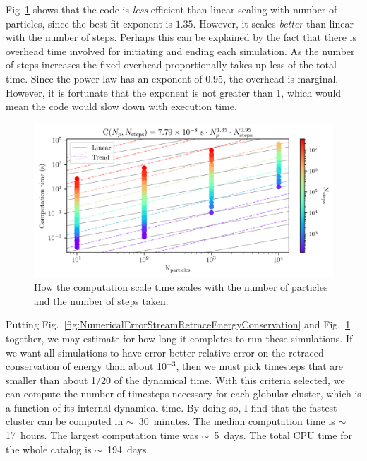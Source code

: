         Fig~\ref{fig:NumericalErrorComputationTimeScalingForStreams} shows that the code is \textit{less} efficient than linear scaling with number of particles, since the best fit exponent is $1.35$. However, it scales \textit{better} than linear with the number of steps. Perhaps this can be explained by the fact that there is overhead time involved for initiating and ending each simulation. As the number of steps increases the fixed overhead proportionally takes up less of the total time. Since the power law has an exponent of $0.95$, the overhead is marginal. However, it is fortunate that the exponent is not greater than 1, which would mean the code would slow down with execution time. 
        \begin{figure}
            \centering
            \includegraphics[width=\linewidth]{images/NumericalErrorComputationTimeScalingForStreams.png}
            \caption[Profiling \texttt{tstrippy}'s computation time for the number of particles and time steps]{How the computation scale time scales with the number of particles and the number of steps taken.}
            \label{fig:NumericalErrorComputationTimeScalingForStreams}
        \end{figure}
        Putting Fig.~\ref{fig:NumericalErrorStreamRetraceEnergyConservation} and Fig.~\ref{fig:NumericalErrorComputationTimeScalingForStreams} together, we may estimate for how long it completes to run these simulations. If we want all simulations to have error better relative error on the retraced conservation of energy than about 10$^{-3}$, then we must pick timesteps that are smaller than about 1/20 of the dynamical time. With this criteria selected, we can compute the number of timesteps necessary for each globular cluster, which is a function of its internal dynamical time. By doing so, I find that the fastest cluster can be computed in $\sim$~30~minutes. The median computation time is $\sim$17~hours. The largest computation time was $\sim$~5~days. The total CPU time for the whole catalog is $\sim$~194~days. 


